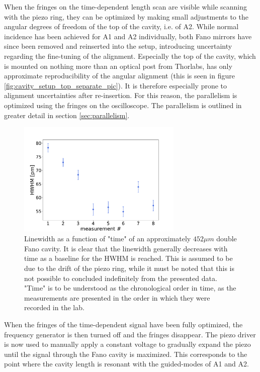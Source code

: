 When the fringes on the time-dependent length scan are visible while scanning with the piezo ring, they can be optimized by making small adjustments to the angular degrees of freedom of the top of the cavity, i.e. of A2. While normal incidence has been achieved for A1 and A2 individually, both Fano mirrors have since been removed and reinserted into the setup, introducing uncertainty regarding the fine-tuning of the alignment. Especially the top of the cavity, which is mounted on nothing more than an optical post from Thorlabs, has only approximate reproducibility of the angular alignment (this is seen in figure \ref{fig:cavity_setup_top_separate_pic}). It is therefore especially prone to alignment uncertainties after re-insertion. For this reason, the parallelism is optimized using the fringes on the oscilloscope. The parallelism is outlined in greater detail in section \ref{sec:parallelism}.

\begin{figure}[h!]
    \centering
    \includegraphics[width=0.7\textwidth]{figures/HWHM_vs_time_20250266_452um.pdf}
    \caption{Linewidth as a function of "time" of an approximately $452 \mu m$ double Fano cavity. It is clear that the linewidth generally decreases with time as a baseline for the HWHM is reached. This is assumed to be due to the drift of the piezo ring, while it must be noted that this is not possible to concluded indefinitely from the presented data. "Time" is to be understood as the chronological order in time, as the measurements are presented in the order in which they were recorded in the lab.}
    \label{fig:HWHM_vs_time}
\end{figure}

When the fringes of the time-dependent signal have been fully optimized, the frequency generator is then turned off and the fringes disappear. The piezo driver is now used to manually apply a constant voltage to gradually expand the piezo until the signal through the Fano cavity is maximized. This corresponds to the point where the cavity length is resonant with the guided-modes of A1 and A2.

